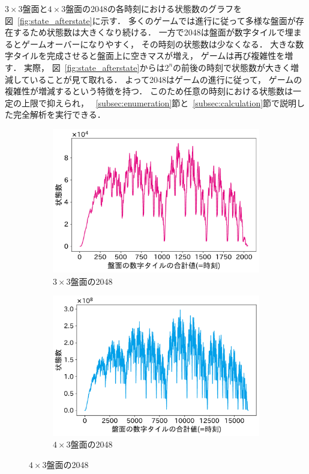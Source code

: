 $3\times3$盤面と$4\times3$盤面の2048の各時刻における状態数のグラフを図~\ref{fig:state_afterstate}に示す．
多くのゲームでは進行に従って多様な盤面が存在するため状態数は大きくなり続ける．
一方で2048は盤面が数字タイルで埋まるとゲームオーバーになりやすく， その時刻の状態数は少なくなる．
大きな数字タイルを完成させると盤面上に空きマスが増え， ゲームは再び複雑性を増す．
実際， 図~\ref{fig:state_afterstate}からは$2^n$の前後の時刻で状態数が大きく増減していることが見て取れる．
よって2048はゲームの進行に従って， ゲームの複雑性が増減するという特徴を持つ．
このため任意の時刻における状態数は一定の上限で抑えられ， ~\ref{subsec:enumeration}節と~\ref{subsec:calculation}節で説明した完全解析を実行できる．
\begin{figure}
\vspace{0.2cm}
\begin{subfigure}[T]{0.4\columnwidth}
    \centering
    \includegraphics[width=\columnwidth]{figures/graph_mini.pdf}
    \caption{$3\times3$盤面の2048}
    \label{fig:graph_mini}
\end{subfigure}
\hspace{1cm}
\begin{subfigure}[T]{0.4\columnwidth}
    \centering
    \includegraphics[width=\columnwidth]{figures/graph_mid.pdf}
    \caption{$4\times3$盤面の2048}
    \label{fig:graph_mid}
\end{subfigure}
\label{fig:time_state_num}
\end{figure}

